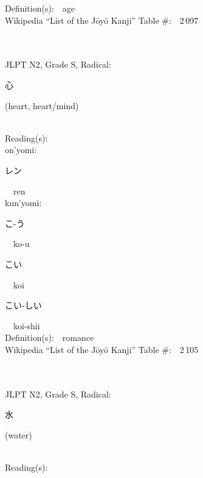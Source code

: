 \begin{multicols}{2}
Definition(s):\ \ age \\
Wikipedia ``List of the J\=oy\=o Kanji'' Table \#:\ \ 2\,097 \\
\ \ \\
{\fontsize{34pt}{40pt}  }\ \ \\  %
{JLPT N2, Grade S, Radical:\ \ {\begin{CJK}{UTF8}{min} 心 \end{CJK}} (heart, heart/mind) } \\
Reading(s):\ \ \\
{\hspace*{1em}}on'yomi:\ \ \\
{\hspace*{2em}}{\begin{CJK}{UTF8}{min} レン \end{CJK}}\ \ ren\ \ \\
{\hspace*{1em}}kun'yomi:\ \ \\
{\hspace*{2em}}{\begin{CJK}{UTF8}{min} こ-う \end{CJK}}\ \ ko-u\ \ \\
{\hspace*{2em}}{\begin{CJK}{UTF8}{min} こい \end{CJK}}\ \ koi\ \ \\
{\hspace*{2em}}{\begin{CJK}{UTF8}{min} こい-しい \end{CJK}}\ \ koi-shii\ \ \\
Definition(s):\ \ romance \\
Wikipedia ``List of the J\=oy\=o Kanji'' Table \#:\ \ 2\,105 \\
\ \ \\
{\fontsize{34pt}{40pt}  }\ \ \\  %
{JLPT N2, Grade S, Radical:\ \ {\begin{CJK}{UTF8}{min} 水 \end{CJK}} (water) } \\
Reading(s):\ \ \\

\end{multicols}
